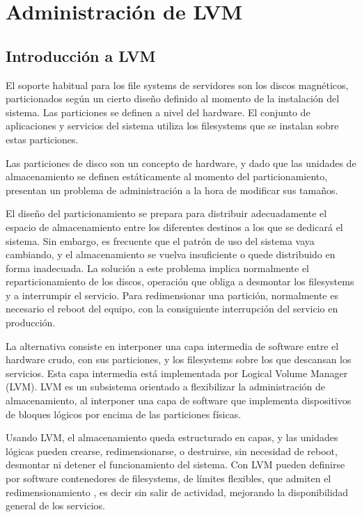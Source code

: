 
\section{Administración de LVM}
\subsection{Introducción a  LVM}
\label{sub:introLVM}
El soporte habitual para los file systems de servidores son los discos magnéticos, particionados según un cierto diseño definido al momento de la instalación del sistema. Las particiones se definen a nivel del hardware. El conjunto de aplicaciones y servicios del sistema utiliza los filesystems que se instalan sobre estas particiones. 

Las particiones de disco son un concepto de hardware, y dado que las unidades de almacenamiento se definen estáticamente al momento del particionamiento, presentan un problema de administración a la hora de modificar sus tamaños. 


El diseño del particionamiento se prepara para distribuir adecuadamente el espacio de almacenamiento entre los diferentes destinos a los que se dedicará el sistema. Sin embargo, es frecuente que el patrón de uso del sistema vaya cambiando, y el almacenamiento se vuelva insuficiente o quede distribuido en forma inadecuada. La solución a este problema implica normalmente el reparticionamiento de los discos, operación que obliga a desmontar los filesystems y a interrumpir el servicio. Para redimensionar una partición, normalmente es necesario el reboot del equipo, con la consiguiente interrupción del servicio en producción. 


La alternativa consiste en interponer una capa intermedia de software entre el hardware crudo, con sus particiones, y los filesystems sobre los que descansan los servicios. Esta capa intermedia está implementada por Logical Volume Manager (LVM). LVM es un subsistema orientado a flexibilizar la administración de almacenamiento, al interponer una capa de software que implementa dispositivos de bloques lógicos por encima de las particiones físicas. 

Usando LVM, el almacenamiento queda estructurado en capas, y las unidades lógicas pueden crearse, redimensionarse, o destruirse, sin necesidad de reboot, desmontar ni detener el funcionamiento del sistema. Con LVM pueden definirse por software contenedores de filesystems, de límites flexibles, que admiten el redimensionamiento , es decir sin salir de actividad, mejorando la disponibilidad general de los servicios.

